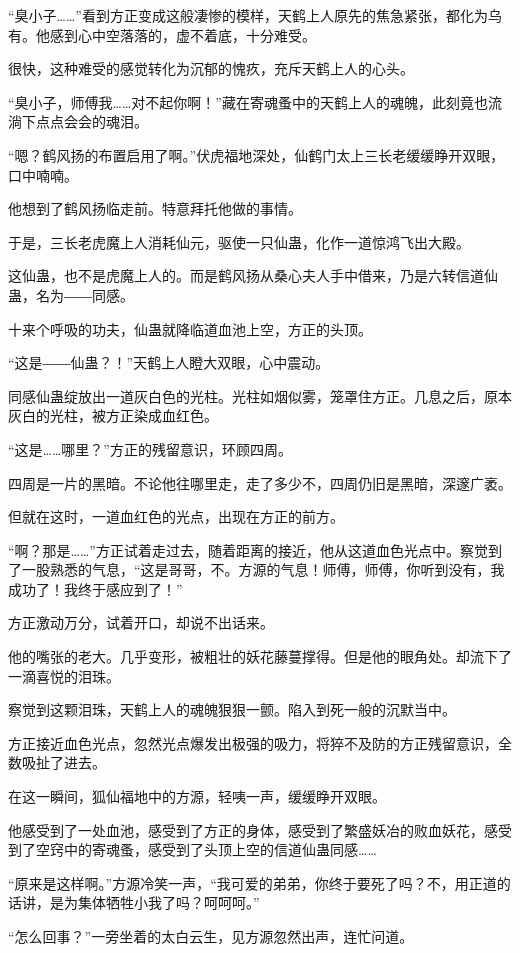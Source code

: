 \begin{this_body}
“臭小子……”看到方正变成这般凄惨的模样，天鹤上人原先的焦急紧张，都化为乌有。他感到心中空落落的，虚不着底，十分难受。

很快，这种难受的感觉转化为沉郁的愧疚，充斥天鹤上人的心头。

“臭小子，师傅我……对不起你啊！”藏在寄魂蚤中的天鹤上人的魂魄，此刻竟也流淌下点点会会的魂泪。

“嗯？鹤风扬的布置启用了啊。”伏虎福地深处，仙鹤门太上三长老缓缓睁开双眼，口中喃喃。

他想到了鹤风扬临走前。特意拜托他做的事情。

于是，三长老虎魔上人消耗仙元，驱使一只仙蛊，化作一道惊鸿飞出大殿。

这仙蛊，也不是虎魔上人的。而是鹤风扬从桑心夫人手中借来，乃是六转信道仙蛊，名为――同感。

十来个呼吸的功夫，仙蛊就降临道血池上空，方正的头顶。

“这是――仙蛊？！”天鹤上人瞪大双眼，心中震动。

同感仙蛊绽放出一道灰白色的光柱。光柱如烟似雾，笼罩住方正。几息之后，原本灰白的光柱，被方正染成血红色。

“这是……哪里？”方正的残留意识，环顾四周。

四周是一片的黑暗。不论他往哪里走，走了多少不，四周仍旧是黑暗，深邃广袤。

但就在这时，一道血红色的光点，出现在方正的前方。

“啊？那是……”方正试着走过去，随着距离的接近，他从这道血色光点中。察觉到了一股熟悉的气息，“这是哥哥，不。方源的气息！师傅，师傅，你听到没有，我成功了！我终于感应到了！”

方正激动万分，试着开口，却说不出话来。

他的嘴张的老大。几乎变形，被粗壮的妖花藤蔓撑得。但是他的眼角处。却流下了一滴喜悦的泪珠。

察觉到这颗泪珠，天鹤上人的魂魄狠狠一颤。陷入到死一般的沉默当中。

方正接近血色光点，忽然光点爆发出极强的吸力，将猝不及防的方正残留意识，全数吸扯了进去。

在这一瞬间，狐仙福地中的方源，轻咦一声，缓缓睁开双眼。

他感受到了一处血池，感受到了方正的身体，感受到了繁盛妖冶的败血妖花，感受到了空窍中的寄魂蚤，感受到了头顶上空的信道仙蛊同感……

“原来是这样啊。”方源冷笑一声，“我可爱的弟弟，你终于要死了吗？不，用正道的话讲，是为集体牺牲小我了吗？呵呵呵。”

“怎么回事？”一旁坐着的太白云生，见方源忽然出声，连忙问道。


\end{this_body}
